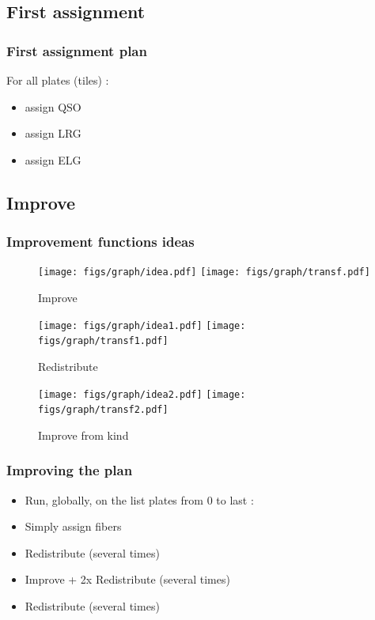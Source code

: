 \documentclass{beamer}
\begin{document}
\subsection{First assignment}
\begin{frame}\frametitle{First assignment plan}
	For all plates (tiles) :
	\begin{itemize}
		\item assign QSO
		\item assign LRG
		\item assign ELG
	\end{itemize}
\end{frame}


\subsection{Improve}
\begin{frame}\frametitle{Improvement functions ideas}
	\begin{center}
		\begin{figure}[H]
			\texttt{[image: figs/graph/idea.pdf]}
			\hspace*{1cm}
			\texttt{[image: figs/graph/transf.pdf]}\hfill
			\caption{Improve}\label{transf}
		\end{figure}

		\begin{figure}[H]
			\texttt{[image: figs/graph/idea1.pdf]}
			\hspace*{1cm}
			\texttt{[image: figs/graph/transf1.pdf]}\hfill
			\caption{Redistribute}\label{transf1}
		\end{figure}

		\begin{figure}[H]
			\texttt{[image: figs/graph/idea2.pdf]}
			\hspace*{1cm}
			\texttt{[image: figs/graph/transf2.pdf]}\hfill
			\caption{Improve from kind}\label{transf2}
		\end{figure}
	\end{center}
\end{frame}


\begin{frame}\frametitle{Improving the plan}
	\begin{itemize}
		\item Run, globally, on the list plates from 0 to last :
		\item Simply assign fibers
		\item Redistribute (several times)
		\item Improve + 2x Redistribute (several times)
		\item Redistribute (several times)
	\end{itemize}
\end{frame}
\end{document}
